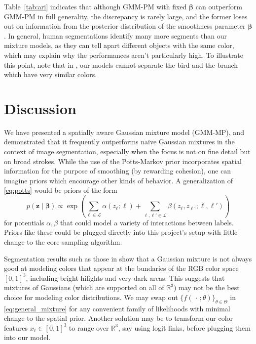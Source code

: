 \documentclass[12pt]{article}
\newcommand{\R}{\mathbb{R}}
\newcommand{\LL}{\mathcal{L}}
\begin{document}
Table~\ref{tab:ari} indicates that although GMM-PM with fixed $\bm{\beta}$ can
outperform GMM-PM in full generality, the discrepancy is rarely large, and the
former loses out on information from the posterior distribution of the
smoothness parameter $\bm{\beta}$.
In general, human segmentations identify many more segments than our mixture
models, as they can tell apart different objects with the same color, which may
explain why the performances aren't particularly high.
To illustrate this point, note that in , our models cannot
separate the bird and the branch which have very similar colors.


\section{Discussion}

We have presented a spatially aware Gaussian mixture model (GMM-MP), and
demonstrated that it frequently outperforms na\"ive Gaussian mixtures in the
context of image segmentation, especially when the focus is not on fine detail
but on broad strokes.
While the use of the Potts-Markov prior incorporates spatial information for
the purpose of smoothing (by rewarding cohesion), one can imagine priors which
encourage other kinds of behavior.
A generalization of \eqref{eq:potts} would be priors of the form
\begin{equation}
    p(\bm{z} \mid \bm{\beta})
        \propto \exp\left(\sum_{\ell \in \LL} \alpha(z_\ell; \ell) + \sum_{\ell, \ell' \in \LL} \beta(z_\ell, z_{\ell'}; \ell, \ell')\right)
\end{equation}
for potentials $\alpha, \beta$ that could model a variety of interactions
between labels.
Priors like these could be plugged directly into this project's setup with
little change to the core sampling algorithm.

Segmentation results such as those in
 show that a Gaussian mixture
is not always good at modeling colors that appear at the bundaries of the RGB
color space $[0, 1]^3$, including bright hilights and very dark areas.
This suggests that mixtures of Gaussians (which are supported on all of $\R^3$)
may not be the best choice for modeling color distributions.
We may swap out $\{f(\,\cdot\,; \theta)\}_{\theta \in \Theta}$ in
\eqref{eq:general_mixture} for any convenient family of likelihoods with
minimal change to the spatial prior.
Another solution may be to transform our color features $x_\ell \in [0, 1]^3$
to range over $\R^3$, say using logit links, before plugging them into our
model.
\end{document}
